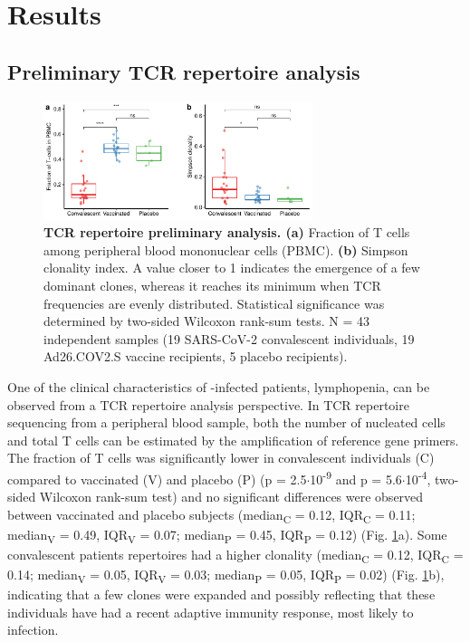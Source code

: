 \chapter*{Results}
\label{cap:res}

\section*{Preliminary TCR repertoire analysis}


\begin{figure}[t]
	\centering
	\includegraphics[width=0.7\textwidth,keepaspectratio]{figures/fig1.pdf}
	\caption{\textbf{TCR repertoire preliminary analysis. (a)} Fraction of T cells among peripheral blood mononuclear cells (PBMC). \textbf{(b)} Simpson clonality index. A value closer to 1 indicates the emergence of a few dominant clones, whereas it reaches its minimum when TCR frequencies are evenly distributed. Statistical significance was determined by two-sided Wilcoxon rank-sum tests. N = 43 independent samples (19 SARS-CoV-2 convalescent individuals, 19 Ad26.COV2.S vaccine recipients, 5 placebo recipients).}
	\label{fig:lymphopenia}
\end{figure}


One of the clinical characteristics of \covid-infected patients, lymphopenia, can be observed from a TCR repertoire analysis perspective. In TCR repertoire sequencing from a peripheral blood sample, both the number of nucleated cells and total T cells can be estimated by the amplification of reference gene primers. The fraction of T cells was significantly lower in convalescent individuals (C) compared to vaccinated (V) and placebo (P) (p = 2.5$\cdot$10\textsuperscript{-9} and p = 5.6$\cdot$10\textsuperscript{-4}, two-sided Wilcoxon rank-sum test) and no significant differences were observed between vaccinated and placebo subjects (median\textsubscript{C} = 0.12, IQR\textsubscript{C} = 0.11; median\textsubscript{V} = 0.49, IQR\textsubscript{V} = 0.07; median\textsubscript{P} = 0.45, IQR\textsubscript{P} = 0.12) (Fig. \ref{fig:lymphopenia}a). Some convalescent patients \TCRB{} repertoires had a higher clonality (median\textsubscript{C} = 0.12, IQR\textsubscript{C} = 0.14; median\textsubscript{V} = 0.05, IQR\textsubscript{V} = 0.03; median\textsubscript{P} = 0.05, IQR\textsubscript{P} = 0.02) (Fig. \ref{fig:lymphopenia}b), indicating that a few clones were expanded and possibly reflecting that these individuals have had a recent adaptive immunity response, most likely to \covid{} infection.







